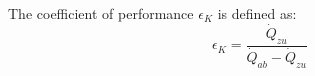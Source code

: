 The coefficient of performance \( \epsilon_K \) is defined as:  
\[
\epsilon_K = \frac{\dot{Q}_{zu}}{\dot{Q}_{ab} - \dot{Q}_{zu}}
\]